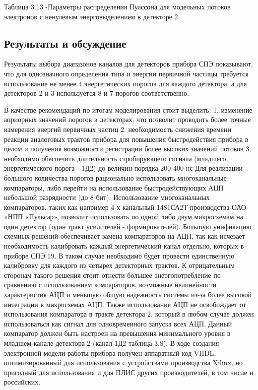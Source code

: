 Таблица 3.13 -Параметры распределения Пуассона для модельных потоков электронов с ненулевым энерговыделением в детекторе 2

\subsection{Результаты и обсуждение}


Результаты выбора диапазонов каналов для детекторов прибора СПЭ показывают, что для однозначного определения типа и энергии первичной частицы требуется использование не менее 4 энергетических порогов для каждого детектора, а для детекторов 2 и 3 используется 8 и 7 порогов соответственно. 

В качестве рекомендаций по итогам моделирования стоит выделить:
1.	изменение априорных значений порогов в детекторах, что позволит проводить более точные измерения энергий первичных частиц 
2.	необходимость снижения времени реакции аналоговых трактов прибора для повышения быстродействия прибора в целом и получения возможности регистрации более высоких значений потоков
3.	необходимо обеспечить длительность стробирующего сигнала (младшего энергетического порога - 1Д2) до величин порядка 200-400 нс
Для реализации большого количества порогов рационально использовать многоканальные компараторы, либо перейти на использование быстродействующих АЦП небольшой разрядности (до 8 бит). Использование многоканальных компараторов, таких как например 4-х канальный 1481СА2Т производства ОАО «НПП «Пульсар», позволит использовать по одной либо двум микросхемам на один детектор (один тракт усилителей - формирователей). Большую унификацию схемных решений обеспечивает замена компараторов на АЦП, так как исчезает необходимость калибровать каждый энергетический канал отдельно, которых в приборе СПЭ 19. В таком случае необходимо будет провести единственную калибровку для каждого из четырех детекторных трактов. К отрицательным сторонам такого решения стоит отнести большее энергопотребление по сравнению с использованием компараторов, возможные нелинейности характеристик АЦП и меньшую общую надежность системы из-за более высокой интеграции в микросхемах АЦП. Также использование АЦП не освобождает от использования компаратора в тракте детектора 2, который в любом случае должен использоваться как сигнал для одновременного запуска всех АЦП. Данный компаратор должен быть настроен на превышения минимального уровня в младшем канале детектора 2 (канал 1Д2 таблица 3.8).
В ходе создания электронной модели работы прибора получен аппаратный код VHDL, оптимизированный для использования с устройствами производства Xilinx, но пригодный для использования и для ПЛИС других производителей, в том числе и российских.


